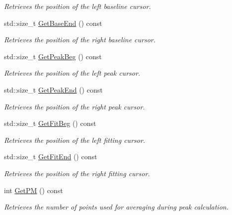 \begin{DoxyCompactItemize}
\begin{DoxyCompactList}\small\item\em Retrieves the position of the left baseline cursor. \item\end{DoxyCompactList}\item 
std::size\_\-t \hyperlink{classRecording_ad51bce5e89ac87cdc818e341eedef208}{GetBaseEnd} () const 
\begin{DoxyCompactList}\small\item\em Retrieves the position of the right baseline cursor. \item\end{DoxyCompactList}\item 
std::size\_\-t \hyperlink{classRecording_ae24bbad06dda64884b11763fdc28deec}{GetPeakBeg} () const 
\begin{DoxyCompactList}\small\item\em Retrieves the position of the left peak cursor. \item\end{DoxyCompactList}\item 
std::size\_\-t \hyperlink{classRecording_a49b39637356c545c2a3520d1865a5588}{GetPeakEnd} () const 
\begin{DoxyCompactList}\small\item\em Retrieves the position of the right peak cursor. \item\end{DoxyCompactList}\item 
std::size\_\-t \hyperlink{classRecording_ad54ad852c63945418ce8fad67cebd803}{GetFitBeg} () const 
\begin{DoxyCompactList}\small\item\em Retrieves the position of the left fitting cursor. \item\end{DoxyCompactList}\item 
std::size\_\-t \hyperlink{classRecording_a82f1e579b31a2fbcc6d526050ee919dd}{GetFitEnd} () const 
\begin{DoxyCompactList}\small\item\em Retrieves the position of the right fitting cursor. \item\end{DoxyCompactList}\item 
int \hyperlink{classRecording_aac8ab06e8e054bdb3fda76963a5be2ac}{GetPM} () const 
\begin{DoxyCompactList}\small\item\em Retrieves the number of points used for averaging during peak calculation. \item\end{DoxyCompactList}\item 

\end{DoxyCompactItemize}
